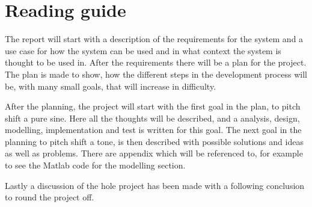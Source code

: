 
\chapter*{Reading guide}
The report will start with a description of the requirements for the system and a use case for how the system can be used and in what context the system is thought to be used in.
After the requirements there will be a plan for the project.
The plan is made to show, how the different steps in the development process will be, with many small goals, that will increase in difficulty.

After the planning, the project will start with the first goal in the plan, to pitch shift a pure sine. 
Here all the thoughts will be described, and a analysis, design, modelling, implementation and test is written for this goal. 
The next goal in the planning to pitch shift a tone, is then described with possible solutions and ideas as well as problems.
There are appendix which will be referenced to, for example to see the Matlab code for the modelling section. 

Lastly a discussion of the hole project has been made with a following conclusion to round the project off. 
